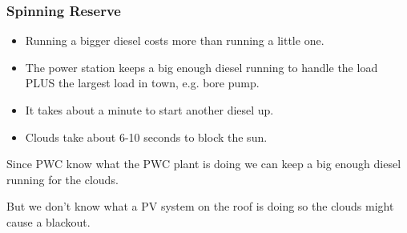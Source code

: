 \documentclass{beamer}
\begin{document}
\begin{frame}\frametitle{Spinning Reserve}
  \begin{itemize}
  \item Running a bigger diesel costs more than running a little one.
  \item The power station keeps a big enough diesel running to handle
    the load PLUS the largest load in town, e.g. bore pump. 
  \item It takes about a minute to start another diesel up.
  \item Clouds take about 6-10 seconds to block the sun.
  \end{itemize}
  Since PWC know what the PWC plant is doing we can keep a big enough
  diesel running for the clouds.

  But we don't know what a PV system on the roof is doing
  so the clouds might cause a blackout.
\end{frame}
\end{document}
